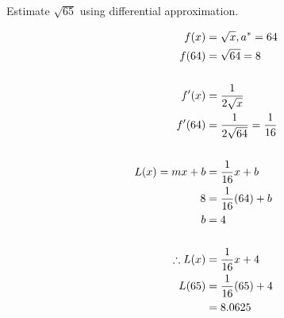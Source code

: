 \begin{exercise}\nonumber
    Estimate $ \sqrt{65} $ using differential approximation.

    \begin{align}
        f(x)            & = \sqrt{x}, a^* = 64                  \\
        f(64)           & = \sqrt{64} = 8                       \\
        \\
        f'(x)           & = {1 \over 2\sqrt{x}}                 \\
        f'(64)          & = {1 \over 2\sqrt{64}} = {1 \over 16} \\
        \\
        L(x) = mx + b   & = {1 \over 16}x + b                   \\
        8               & = {1 \over 16}(64) + b                \\
        b               & = 4                                   \\
        \\
        \therefore L(x) & = {1 \over 16}x +4                    \\
        L(65)           & = {1 \over 16}(65) + 4                \\
                        & = 8.0625
    \end{align}
\end{exercise}